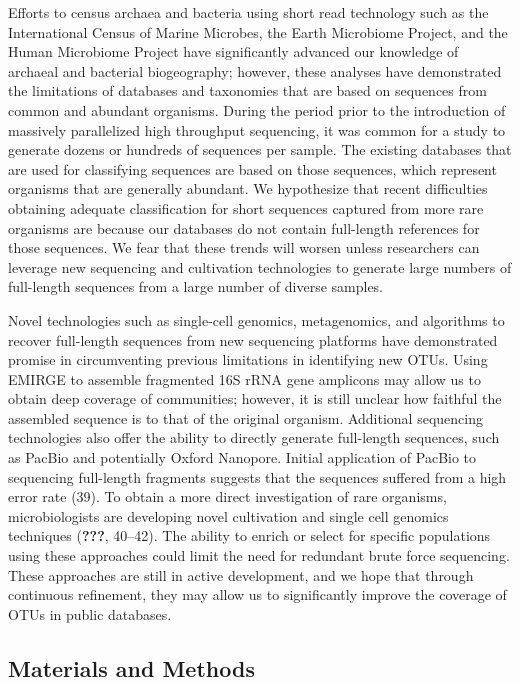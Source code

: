 \documentclass[11pt,]{article}
\begin{document}
Efforts to census archaea and bacteria using short read technology such
as the International Census of Marine Microbes, the Earth Microbiome
Project, and the Human Microbiome Project have significantly advanced
our knowledge of archaeal and bacterial biogeography; however, these
analyses have demonstrated the limitations of databases and taxonomies
that are based on sequences from common and abundant organisms. During
the period prior to the introduction of massively parallelized high
throughput sequencing, it was common for a study to generate dozens or
hundreds of sequences per sample. The existing databases that are used
for classifying sequences are based on those sequences, which represent
organisms that are generally abundant. We hypothesize that recent
difficulties obtaining adequate classification for short sequences
captured from more rare organisms are because our databases do not
contain full-length references for those sequences. We fear that these
trends will worsen unless researchers can leverage new sequencing and
cultivation technologies to generate large numbers of full-length
sequences from a large number of diverse samples.

Novel technologies such as single-cell genomics, metagenomics, and
algorithms to recover full-length sequences from new sequencing
platforms have demonstrated promise in circumventing previous
limitations in identifying new OTUs. Using EMIRGE to assemble fragmented
16S rRNA gene amplicons may allow us to obtain deep coverage of
communities; however, it is still unclear how faithful the assembled
sequence is to that of the original organism. Additional sequencing
technologies also offer the ability to directly generate full-length
sequences, such as PacBio and potentially Oxford Nanopore. Initial
application of PacBio to sequencing full-length fragments suggests that
the sequences suffered from a high error rate (39). To obtain a more
direct investigation of rare organisms, microbiologists are developing
novel cultivation and single cell genomics techniques (\textbf{???},
40--42). The ability to enrich or select for specific populations using
these approaches could limit the need for redundant brute force
sequencing. These approaches are still in active development, and we
hope that through continuous refinement, they may allow us to
significantly improve the coverage of OTUs in public databases.

\subsection{Materials and Methods}\label{materials-and-methods}
\end{document}
